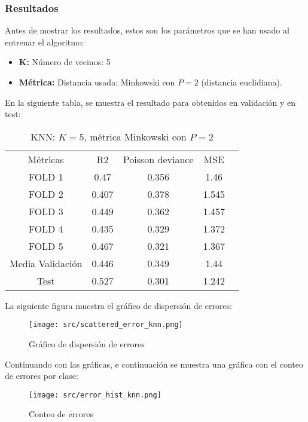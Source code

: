 \subsubsection{Resultados}
Antes de mostrar los resultados, estos son los parámetros que se han usado al entrenar el algoritmo:
\begin{itemize}
	\item \textbf{K:} Número de vecinos: 5
	\item \textbf{Métrica:} Distancia usada: Minkowski con $P=2$ (distancia euclidiana).
\end{itemize}
En la siguiente tabla, se muestra el resultado para obtenidos en validación y en test:
\linebreak
\begin{table}[H]
	 \centering
	\begin{tabular}{|c|c|c|c|c}
		\cline{1-4}
		Métricas         & R2    & Poisson deviance & MSE   \\ \cline{1-4}
		FOLD 1           & 0.47  & 0.356            & 1.46  \\ \cline{1-4}
		FOLD 2           & 0.407 & 0.378            & 1.545 \\ \cline{1-4}
		FOLD 3           & 0.449 & 0.362            & 1.457 \\ \cline{1-4}
		FOLD 4           & 0.435 & 0.329            & 1.372 \\ \cline{1-4}
		FOLD 5           & 0.467 & 0.321            & 1.367 \\ \cline{1-4}
		Media Validación & 0.446 & 0.349            & 1.44  \\ \cline{1-4}
		Test             & 0.527 & 0.301            & 1.242 \\ \cline{1-4}
	\end{tabular}
	\caption{KNN: $K=5$, métrica Minkowski con $P=2$}
	\label{tab:knn_res}
\end{table}
La siguiente figura muestra el gráfico de dispersión de errores:
\begin{figure}[H]
	\centering
	\texttt{[image: src/scattered\_error\_knn.png]}
	\caption{Gráfico de dispersión de errores}
	\label{fig:knn_scattered}
\end{figure}
Continuando con las gráficas, e continuación se muestra una gráfica con el conteo de errores por clase:\\
\linebreak
\begin{figure}[H]
	\centering
	\texttt{[image: src/error\_hist\_knn.png]}
	\caption{Conteo de errores}
	\label{fig:knn_error_plot}
\end{figure}

